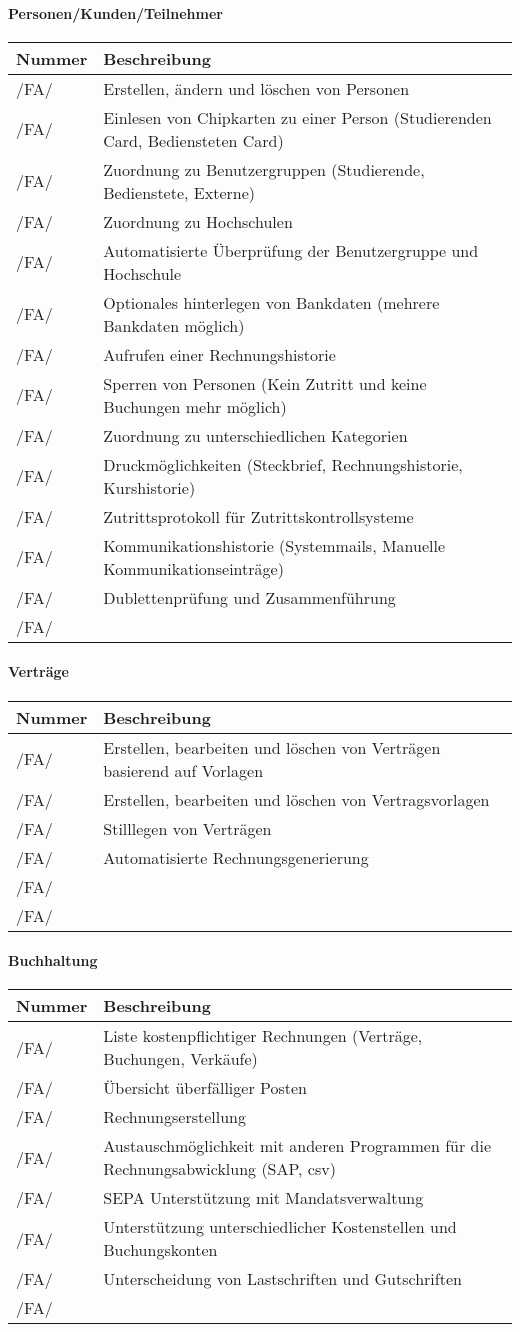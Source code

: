 \documentclass[a4paper,12pt]{article}
\newcommand\addrow[2]{#1 &#2\\ }
\newcommand\addheading[2]{#1 &#2\\ \hline}
\newcommand\tabularhead{\begin{tabular}{lp{13cm}}
\hline
}
\newenvironment{usecase}{\tabularhead}
{\hline\end{tabular}}
\begin{document}
\paragraph{\textbf{Personen/Kunden/Teilnehmer}\\}
\begin{usecase}
  \addheading{Nummer}{Beschreibung} 
  \addrow{/FA/}{Erstellen, ändern und löschen von Personen}
  \addrow{/FA/}{Einlesen von Chipkarten zu einer Person (Studierenden Card, Bediensteten Card)}
  \addrow{/FA/}{Zuordnung zu Benutzergruppen (Studierende, Bedienstete, Externe)}
  \addrow{/FA/}{Zuordnung zu Hochschulen}
  \addrow{/FA/}{Automatisierte Überprüfung der Benutzergruppe und Hochschule}
  \addrow{/FA/}{Optionales hinterlegen von Bankdaten (mehrere Bankdaten möglich)}
  \addrow{/FA/}{Aufrufen einer Rechnungshistorie}
  \addrow{/FA/}{Sperren von Personen (Kein Zutritt und keine Buchungen mehr möglich)}
  \addrow{/FA/}{Zuordnung zu unterschiedlichen Kategorien}
  \addrow{/FA/}{Druckmöglichkeiten (Steckbrief, Rechnungshistorie, Kurshistorie)}
  \addrow{/FA/}{Zutrittsprotokoll für Zutrittskontrollsysteme}
  \addrow{/FA/}{Kommunikationshistorie (Systemmails, Manuelle Kommunikationseinträge)}
  \addrow{/FA/}{Dublettenprüfung und Zusammenführung}
  \addrow{/FA/}{}
\end{usecase}

\paragraph{\textbf{Verträge}\\}
\begin{usecase}
  \addheading{Nummer}{Beschreibung} 
  \addrow{/FA/}{Erstellen, bearbeiten und löschen von Verträgen basierend auf Vorlagen} 
  \addrow{/FA/}{Erstellen, bearbeiten und löschen von Vertragsvorlagen}
  \addrow{/FA/}{Stilllegen von Verträgen}
  \addrow{/FA/}{Automatisierte Rechnungsgenerierung}
  \addrow{/FA/}{}
  \addrow{/FA/}{}
\end{usecase}

\paragraph{\textbf{Buchhaltung}\\}
\begin{usecase}
  \addheading{Nummer}{Beschreibung} 
  \addrow{/FA/}{Liste kostenpflichtiger Rechnungen (Verträge, Buchungen, Verkäufe)} 
  \addrow{/FA/}{Übersicht überfälliger Posten}
  \addrow{/FA/}{Rechnungserstellung}
  \addrow{/FA/}{Austauschmöglichkeit mit anderen Programmen für die Rechnungsabwicklung (SAP, csv)}
  \addrow{/FA/}{SEPA Unterstützung mit Mandatsverwaltung}
  \addrow{/FA/}{Unterstützung unterschiedlicher Kostenstellen und Buchungskonten}
  \addrow{/FA/}{Unterscheidung von Lastschriften und Gutschriften}
  \addrow{/FA/}{}
\end{usecase}
\end{document}
